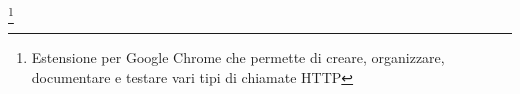 \footnote{Estensione per Google Chrome che permette di creare, organizzare, documentare e testare vari tipi di chiamate HTTP}
